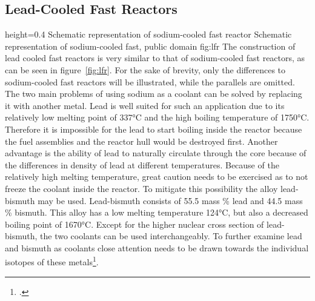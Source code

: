 \subsection{Lead-Cooled Fast Reactors}
    {height=0.4\textheight}
    {Schematic representation of sodium-cooled fast reactor}
    {Schematic representation of sodium-cooled fast, public domain}
    {fig:lfr}
The construction of lead cooled fast reactors is very similar to that of sodium-cooled fast reactors,
as can be seen in figure~\ref{fig:lfr}. For the sake of brevity, only the differences to sodium-cooled
fast reactors will be illustrated, while the parallels are omitted.\\
The two main problems of using sodium as a coolant can be solved by replacing it with another metal.
Lead is well suited for such an application due to its relatively low melting point of 337°C and
the high boiling temperature of 1750°C. Therefore it is impossible for the lead to start boiling inside
the reactor because the fuel assemblies and the reactor hull would be destroyed first.
Another advantage is the ability of lead to naturally circulate through the core because of the differences
in density of lead at different temperatures.
Because of the relatively high melting temperature, great caution needs to be exercised as to not freeze the coolant
inside the reactor. To mitigate this possibility the alloy lead-bismuth may be used. Lead-bismuth consists
of 55.5 mass \% lead and 44.5 mass \% bismuth. This alloy has a low melting temperature 124°C, but also
a decreased boiling point of 1670°C. Except for the higher nuclear cross section of lead-bismuth, the
two coolants can be used interchangeably. To further examine lead and bismuth as coolants close attention
needs to be drawn towards the individual isotopes of these metals\footcite[137-174]{IVHandbook}.
